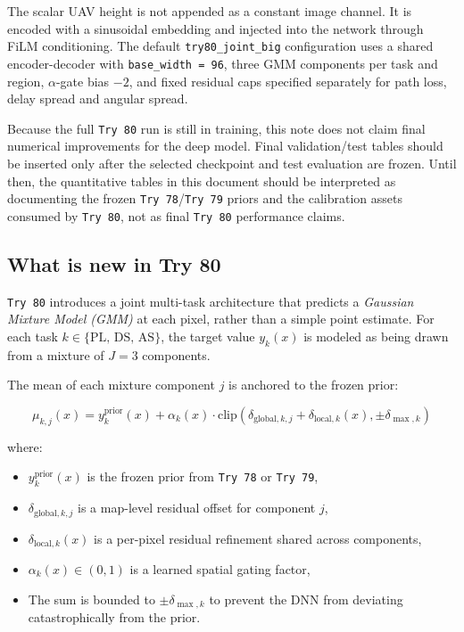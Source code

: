 \documentclass[11pt,a4paper]{article}
\begin{document}
The scalar UAV height is not appended as a constant image channel. It is
encoded with a sinusoidal embedding and injected into the network through FiLM
conditioning. The default \texttt{try80\_joint\_big} configuration uses a
shared encoder-decoder with \texttt{base\_width = 96}, three GMM components
per task and region, \(\alpha\)-gate bias \(-2\), and fixed residual caps
specified separately for path loss, delay spread and angular spread.

Because the full \texttt{Try 80} run is still in training, this note does not
claim final numerical improvements for the deep model. Final validation/test
tables should be inserted only after the selected checkpoint and test
evaluation are frozen. Until then, the quantitative tables in this document
should be interpreted as documenting the frozen \texttt{Try 78}/\texttt{Try 79}
priors and the calibration assets consumed by \texttt{Try 80}, not as final
\texttt{Try 80} performance claims.

\subsection{What is new in Try 80}

\texttt{Try 80} introduces a joint multi-task architecture that predicts a
\emph{Gaussian Mixture Model (GMM)} at each pixel, rather than a simple point
estimate. For each task $k \in \{\mathrm{PL},\, \mathrm{DS},\, \mathrm{AS}\}$,
the target value $y_k(x)$ is modeled as being drawn from a mixture of $J=3$ components.

The mean of each mixture component $j$ is anchored to the frozen prior:

\begin{equation}
\mu_{k,j}(x)
=
y^{\mathrm{prior}}_k(x)
+
\alpha_k(x) \cdot
\mathrm{clip}\left(
\delta_{\mathrm{global},k,j} + \delta_{\mathrm{local},k}(x),
\pm\delta_{\max,k}
\right)
\label{eq:try80_mu}
\end{equation}

where:
\begin{itemize}
\item $y^{\mathrm{prior}}_k(x)$ is the frozen prior from \texttt{Try 78}
      or \texttt{Try 79},
\item $\delta_{\mathrm{global},k,j}$ is a map-level residual offset for component $j$,
\item $\delta_{\mathrm{local},k}(x)$ is a per-pixel residual refinement shared across components,
\item $\alpha_k(x) \in (0,1)$ is a learned spatial gating factor,
\item The sum is bounded to $\pm\delta_{\max,k}$ to prevent the DNN from
      deviating catastrophically from the prior.
\end{itemize}
\end{document}
